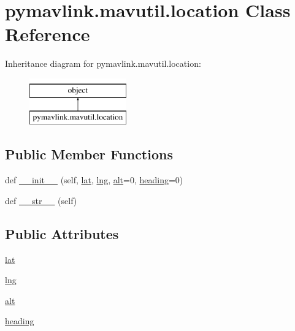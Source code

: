\hypertarget{classpymavlink_1_1mavutil_1_1location}{}\section{pymavlink.\+mavutil.\+location Class Reference}
\label{classpymavlink_1_1mavutil_1_1location}
Inheritance diagram for pymavlink.\+mavutil.\+location\+:\begin{figure}[H]
\begin{center}
\leavevmode
\includegraphics[height=2.000000cm]{classpymavlink_1_1mavutil_1_1location}
\end{center}
\end{figure}
\subsection*{Public Member Functions}
\begin{DoxyCompactItemize}
\item 
def \mbox{\hyperlink{classpymavlink_1_1mavutil_1_1location_a05f23187a42be511f0c0c50c2b15de94}{\+\_\+\+\_\+init\+\_\+\+\_\+}} (self, \mbox{\hyperlink{classpymavlink_1_1mavutil_1_1location_a0e7492d02b5461d3e341f14c63987159}{lat}}, \mbox{\hyperlink{classpymavlink_1_1mavutil_1_1location_a6226c212e18f9de2b4f8291952dd58df}{lng}}, \mbox{\hyperlink{classpymavlink_1_1mavutil_1_1location_abdc87548778ac2d52235734f06f5b1d8}{alt}}=0, \mbox{\hyperlink{classpymavlink_1_1mavutil_1_1location_a31941d0a3788aaf07b3f72b73350ee14}{heading}}=0)
\item 
def \mbox{\hyperlink{classpymavlink_1_1mavutil_1_1location_a1ac1d1a6d3fc7c28970bea2912213efb}{\+\_\+\+\_\+str\+\_\+\+\_\+}} (self)
\end{DoxyCompactItemize}
\subsection*{Public Attributes}
\begin{DoxyCompactItemize}
\item 
\mbox{\hyperlink{classpymavlink_1_1mavutil_1_1location_a0e7492d02b5461d3e341f14c63987159}{lat}}
\item 
\mbox{\hyperlink{classpymavlink_1_1mavutil_1_1location_a6226c212e18f9de2b4f8291952dd58df}{lng}}
\item 
\mbox{\hyperlink{classpymavlink_1_1mavutil_1_1location_abdc87548778ac2d52235734f06f5b1d8}{alt}}
\item 
\mbox{\hyperlink{classpymavlink_1_1mavutil_1_1location_a31941d0a3788aaf07b3f72b73350ee14}{heading}}
\end{DoxyCompactItemize}


